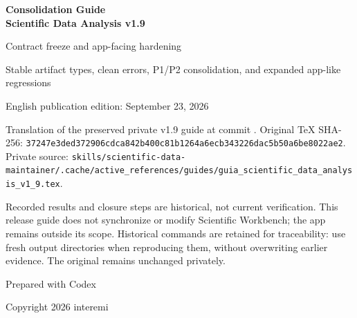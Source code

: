 \documentclass[11pt,a4paper]{article}
\newcommand{\code}[1]{\texttt{\detokenize{#1}}}
\begin{document}
\begin{titlepage}
\centering
\vspace*{1.0cm}
{\Huge\bfseries\color{titleblue} Consolidation Guide\\[0.15cm]
Scientific Data Analysis v1.9\par}
\vspace{0.65cm}
{\Large Contract freeze and app-facing hardening\par}
\vspace{0.8cm}
{\large Stable artifact types, clean errors, P1/P2 consolidation,
and expanded app-like regressions\par}
\vspace{0.8cm}
{\large English publication edition: September 23, 2026\par}
\vspace{0.5cm}
\begin{minipage}{0.93\textwidth}
\small\raggedright
Translation of the preserved private v1.9 guide at commit \code{b9f6176}.
Original TeX SHA-256:
\nolinkurl{37247e3ded372906cdca842b400c81b1264a6ecb343226dac5b50a6be8022ae2}.
Private source:
\nolinkurl{skills/scientific-data-maintainer/.cache/active_references/guides/guia_scientific_data_analysis_v1_9.tex}.

Recorded results and closure steps are historical, not current verification.
This release guide does not synchronize or modify Scientific Workbench;
the app remains outside its scope. Historical commands are retained for
traceability: use fresh output directories when reproducing them, without
overwriting earlier evidence. The original remains unchanged privately.
\end{minipage}
\vfill
{\large Prepared with Codex\par}
{\large Copyright 2026 interemi\par}
\end{titlepage}

\clearpage
{}
\fancyfoot[C]{\thepage}
\begin{abstract}
\code{scientific-data-analysis} v1.9 is a consolidation release. v1.8 prepared
the backend for app consumption; v1.9 reduces debt and freezes the components
an app needs to remain stable: artifact type names, app-facing errors, exposure
limits, app hints, next actions, and realistic regressions.

v1.9 makes the backend more predictable, its blocks clearer, and its outputs
easier to parse before major v2.0 integration. It does not develop or
synchronize Scientific Workbench.
\end{abstract}
\tableofcontents
\newpage
{}
\end{document}
